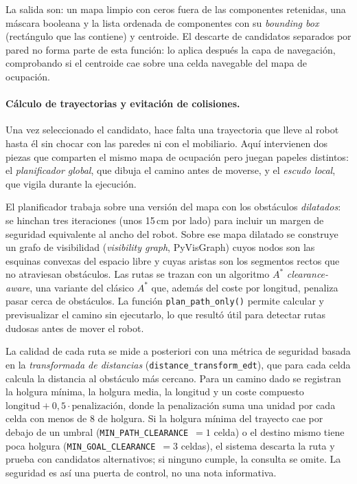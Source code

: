 \documentclass[11pt,fleqn,openany]{book} %
\begin{document}
La salida son: un mapa limpio con ceros fuera de las componentes retenidas, una máscara booleana y la lista ordenada de componentes con su \emph{bounding box} (rectángulo que las contiene) y centroide. El descarte de candidatos separados por pared no forma parte de esta función: lo aplica después la capa de navegación, comprobando si el centroide cae sobre una celda navegable del mapa de ocupación.

\paragraph{Cálculo de trayectorias y evitación de colisiones.} Una vez seleccionado el candidato, hace falta una trayectoria que lleve al robot hasta él sin chocar con las paredes ni con el mobiliario. Aquí intervienen dos piezas que comparten el mismo mapa de ocupación pero juegan papeles distintos: el \emph{planificador global}, que dibuja el camino antes de moverse, y el \emph{escudo local}, que vigila durante la ejecución.

El planificador trabaja sobre una versión del mapa con los obstáculos \emph{dilatados}: se hinchan tres iteraciones (unos 15\,cm por lado) para incluir un margen de seguridad equivalente al ancho del robot. Sobre ese mapa dilatado se construye un grafo de visibilidad (\emph{visibility graph}, PyVisGraph) cuyos nodos son las esquinas convexas del espacio libre y cuyas aristas son los segmentos rectos que no atraviesan obstáculos. Las rutas se trazan con un algoritmo $A^{\!*}$ \emph{clearance-aware}, una variante del clásico $A^{\!*}$ que, además del coste por longitud, penaliza pasar cerca de obstáculos. La función \texttt{plan\_path\_only()} permite calcular y previsualizar el camino sin ejecutarlo, lo que resultó útil para detectar rutas dudosas antes de mover el robot.

La calidad de cada ruta se mide a posteriori con una métrica de seguridad basada en la \emph{transformada de distancias} (\texttt{distance\_transform\_edt}), que para cada celda calcula la distancia al obstáculo más cercano. Para un camino dado se registran la holgura mínima, la holgura media, la longitud y un coste compuesto $\text{longitud} + 0{,}5\cdot\text{penalización}$, donde la penalización suma una unidad por cada celda con menos de 8 de holgura. Si la holgura mínima del trayecto cae por debajo de un umbral (\texttt{MIN\_PATH\_CLEARANCE}~$=1$ celda) o el destino mismo tiene poca holgura (\texttt{MIN\_GOAL\_CLEARANCE}~$=3$ celdas), el sistema descarta la ruta y prueba con candidatos alternativos; si ninguno cumple, la consulta se omite. La seguridad es así una puerta de control, no una nota informativa.
\end{document}
